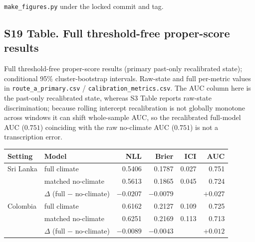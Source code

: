 \documentclass[11pt,a4paper]{article}
\begin{document}
\texttt{make\_figures.py} under the locked commit and tag.

\subsection*{S19 Table. Full threshold-free proper-score results}
\noindent Full threshold-free proper-score results (primary past-only recalibrated state); conditional 95\% cluster-bootstrap intervals. Raw-state and full per-metric values in \texttt{route\_a\_primary.csv} / \texttt{calibration\_metrics.csv}. The AUC column here is the past-only recalibrated state, whereas S3 Table reports raw-state discrimination; because rolling intercept recalibration is not globally monotone across windows it can shift whole-sample AUC, so the recalibrated full-model AUC ($0.751$) coinciding with the raw no-climate AUC ($0.751$) is not a transcription error.\\[0.3em]
{\footnotesize\begin{tabular}{@{}llrrrr@{}}
\toprule
Setting & Model & NLL & Brier & ICI & AUC \\
\midrule
Sri Lanka & full climate & 0.5406 & 0.1787 & 0.027 & 0.751 \\
 & matched no-climate & 0.5613 & 0.1865 & 0.045 & 0.724 \\
 & $\Delta$ (full $-$ no-climate) & $-0.0207$ & $-0.0079$ & & $+0.027$ \\
Colombia & full climate & 0.6162 & 0.2127 & 0.109 & 0.725 \\
 & matched no-climate & 0.6251 & 0.2169 & 0.113 & 0.713 \\
 & $\Delta$ (full $-$ no-climate) & $-0.0089$ & $-0.0043$ & & $+0.012$ \\
\bottomrule
\end{tabular}}

\endgroup
\end{document}
